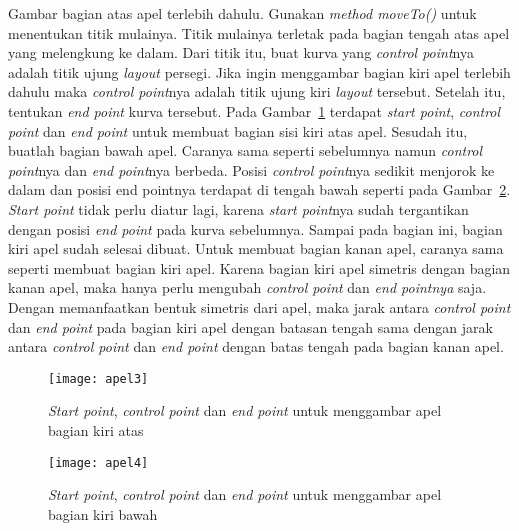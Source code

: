 Gambar bagian atas apel terlebih dahulu. Gunakan \textit{method moveTo()} untuk menentukan titik mulainya. Titik mulainya terletak pada bagian tengah atas apel yang melengkung ke dalam. Dari titik itu, buat kurva yang \textit{control point}nya adalah titik ujung \textit{layout} persegi. Jika ingin menggambar bagian kiri apel terlebih dahulu maka \textit{control point}nya adalah titik ujung kiri \textit{layout} tersebut. Setelah itu, tentukan \textit{end point} kurva tersebut. Pada Gambar~\ref{fig:apel3} terdapat \textit{start point}, \textit{control point} dan \textit{end point} untuk membuat bagian sisi kiri atas apel. Sesudah itu, buatlah bagian bawah apel. Caranya sama seperti sebelumnya namun \textit{control point}nya dan \textit{end point}nya berbeda. Posisi \textit{control point}nya sedikit menjorok ke dalam dan posisi end pointnya terdapat di tengah bawah seperti pada Gambar~\ref{fig:apel4}. \textit{Start point} tidak perlu diatur lagi, karena \textit{start point}nya sudah tergantikan dengan posisi \textit{end point} pada kurva sebelumnya. Sampai pada bagian ini, bagian kiri apel sudah selesai dibuat. Untuk membuat bagian kanan apel, caranya sama seperti membuat bagian kiri apel. Karena bagian kiri apel simetris dengan bagian kanan apel, maka hanya perlu mengubah \textit{control point} dan \textit{end pointnya} saja. Dengan memanfaatkan bentuk simetris dari apel, maka jarak antara \textit{control point} dan \textit{end point} pada bagian kiri apel dengan batasan tengah sama dengan jarak antara \textit{control point} dan \textit{end point} dengan batas tengah pada bagian kanan apel. 

\begin{figure}[H]
	\centering  
	\texttt{[image: apel3]}  
	\caption[\textit{Start point}, \textit{control point} dan \textit{end point} untuk menggambar apel bagian kiri atas]{\textit{Start point}, \textit{control point} dan \textit{end point} untuk menggambar apel bagian kiri atas}
	\label{fig:apel3} 
\end{figure}

\begin{figure}[H]
	\centering  
	\texttt{[image: apel4]}  
	\caption[\textit{Start point}, \textit{control point} dan \textit{end point} untuk menggambar apel bagian kiri bawah]{\textit{Start point}, \textit{control point} dan \textit{end point} untuk menggambar apel bagian kiri bawah}
	\label{fig:apel4} 
\end{figure}

